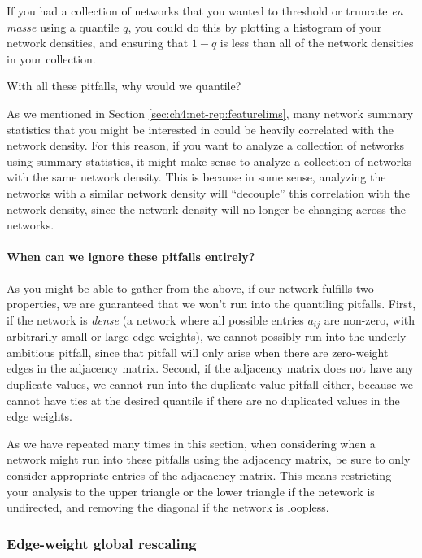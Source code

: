 If you had a collection of networks that you wanted to threshold or truncate \emph{en masse} using a quantile $q$, you could do this by plotting a histogram of your network densities, and ensuring that $1 - q$ is less than all of the network densities in your collection.

\begin{floatingbox}[h]\caption{With all these pitfalls, why would we quantile?}
As we mentioned in Section \ref{sec:ch4:net-rep:featurelims}, many network summary statistics that you might be interested in could be heavily correlated with the network density. For this reason, if you want to analyze a collection of networks using summary statistics, it might make sense to analyze a collection of networks with the same network density. This is because in some sense, analyzing the networks with a similar network density will ``decouple'' this correlation with the network density, since the network density will no longer be changing across the networks.
\end{floatingbox}

\paragraph{When can we ignore these pitfalls entirely?}

As you might be able to gather from the above, if our network fulfills two properties, we are guaranteed that we won't run into the quantiling pitfalls. First, if the network is \textit{dense} (a network where all possible entries $a_{ij}$ are non-zero, with arbitrarily small or large edge-weights), we cannot possibly run into the underly ambitious pitfall, since that pitfall will only arise when there are zero-weight edges in the adjacency matrix. Second, if the adjacency matrix does not have any duplicate values, we cannot run into the duplicate value pitfall either, because we cannot have ties at the desired quantile if there are no duplicated values in the edge weights. 

As we have repeated many times in this section, when considering when a network might run into these pitfalls using the adjacency matrix, be sure to only consider appropriate entries of the adjacaency matrix. This means restricting your analysis to the upper triangle or the lower triangle if the netework is undirected, and removing the diagonal if the network is loopless. 

\subsubsection{Edge-weight global rescaling}

